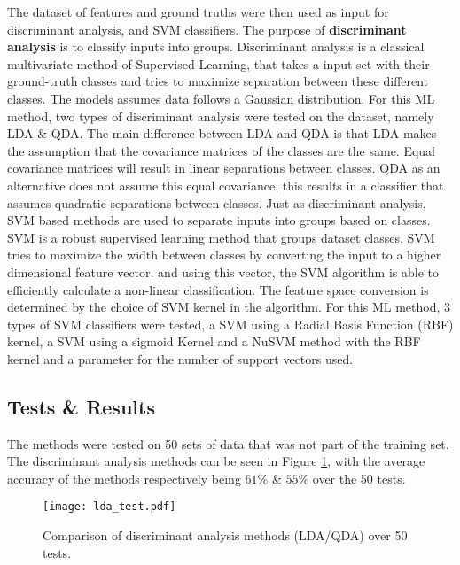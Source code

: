 \documentclass[../main.tex]{subfiles}
\begin{document}
The dataset of features and ground truths were then used as input for discriminant analysis, and SVM classifiers.
The purpose of \textbf{discriminant analysis} is to classify inputs into groups.
Discriminant analysis is a classical multivariate method of Supervised Learning, that takes a input set with their ground-truth classes and tries to maximize separation between these different classes.
The models assumes data follows a Gaussian distribution. 
For this ML method, two types of discriminant analysis were tested on the dataset, namely LDA \& \gls{QDA}.
The main difference between LDA and QDA is that LDA makes the assumption that the covariance matrices of the classes are the same.
Equal covariance matrices will result in linear separations between classes.
QDA as an alternative does not assume this equal covariance, this results in a classifier that assumes quadratic separations between classes.
Just as discriminant analysis, SVM based methods are used to separate inputs into groups based on classes.
SVM is a robust supervised learning method that groups dataset classes.
SVM tries to maximize the width between classes by converting the input to a higher dimensional feature vector, and using this vector, the SVM algorithm is able to efficiently calculate a non-linear classification.
The feature space conversion is determined by the choice of SVM kernel in the algorithm.
For this ML method, 3 types of SVM classifiers were tested, a SVM using a Radial Basis Function (RBF) kernel, a SVM using a sigmoid Kernel and a NuSVM method with the RBF kernel and a parameter for the number of support vectors used.

\subsection{Tests \& Results}

The methods were tested on 50 sets of data that was not part of the training set.
The discriminant analysis methods can be seen in Figure \ref{fig:lda_test}, with the average accuracy of the methods respectively being $61\%$ \& $55\%$ over the 50 tests.

\begin{figure}[H]
\begin{center}
\texttt{[image: lda\_test.pdf]}
\caption{Comparison of discriminant analysis methods (\gls{LDA}/\gls{QDA}) over 50 tests.}
\label{fig:lda_test}
\end{center}
\end{figure}
\end{document}
